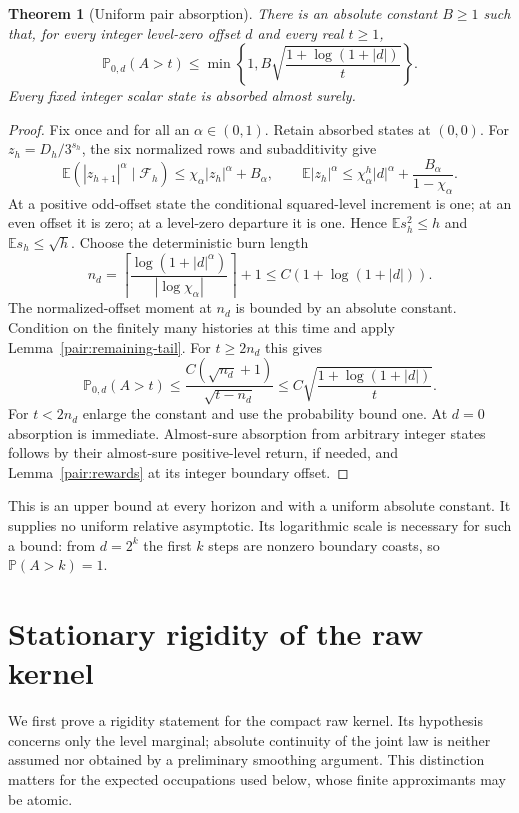 \documentclass[11pt]{amsart}
\newtheorem{theorem}{Theorem}[section]
\theoremstyle{definition}
\theoremstyle{remark}
\newcommand{\E}{\mathbb E}
\newcommand{\PP}{\mathbb P}
\begin{document}
\begin{theorem}[Uniform pair absorption]\label{pair:uniform-tail}\label{thm:pair}
There is an absolute constant $B\ge1$ such that, for every integer
level-zero offset $d$ and every real $t\ge1$,
\[
 \PP_{0,d}(A>t)\le
 \min\left\{1,B\sqrt{\frac{1+\log(1+|d|)}t}\right\}.
\]
Every fixed integer scalar state is absorbed almost surely.
\end{theorem}
\begin{proof}
Fix once and for all an $\alpha\in(0,1)$. Retain absorbed states at
$(0,0)$. For $z_h=D_h/3^{s_h}$, the six normalized rows and
subadditivity give
\[
 \E(|z_{h+1}|^\alpha\mid\mathcal F_h)
       \le\chi_\alpha|z_h|^\alpha+B_\alpha,
 \qquad
 \E|z_h|^\alpha\le\chi_\alpha^h|d|^\alpha+
                          \frac{B_\alpha}{1-\chi_\alpha}.
\]
At a positive odd-offset state the conditional squared-level increment
is one; at an even offset it is zero; at a level-zero departure it is
one. Hence $\E s_h^2\le h$ and $\E s_h\le\sqrt h$.
Choose the deterministic burn length
\[
 n_d=\left\lceil\frac{\log(1+|d|^\alpha)}{|\log\chi_\alpha|}
                         \right\rceil+1
       \le C(1+\log(1+|d|)).
\]
The normalized-offset moment at $n_d$ is bounded by an absolute
constant. Condition on the finitely many histories at this time and
apply Lemma~\ref{pair:remaining-tail}. For $t\ge2n_d$ this gives
\[
 \PP_{0,d}(A>t)
 \le \frac{C(\sqrt{n_d}+1)}{\sqrt{t-n_d}}
 \le C\sqrt{\frac{1+\log(1+|d|)}t}.
\]
For $t<2n_d$ enlarge the constant and use the probability bound one.
At $d=0$ absorption is immediate. Almost-sure absorption from arbitrary
integer states follows by their almost-sure positive-level return,
if needed, and Lemma~\ref{pair:rewards} at its integer boundary offset.
\end{proof}

This is an upper bound at every horizon and with a uniform absolute
constant. It supplies no uniform relative asymptotic. Its logarithmic
scale is necessary for such a bound: from $d=2^k$ the first $k$ steps
are nonzero boundary coasts, so $\PP(A>k)=1$.

\section{Stationary rigidity of the raw kernel}
\label{st:section}

We first prove a rigidity statement for the compact raw kernel.  Its
hypothesis concerns only the level marginal; absolute continuity of the
joint law is neither assumed nor obtained by a preliminary smoothing
argument.  This distinction matters for the expected occupations used
below, whose finite approximants may be atomic.
\end{document}
